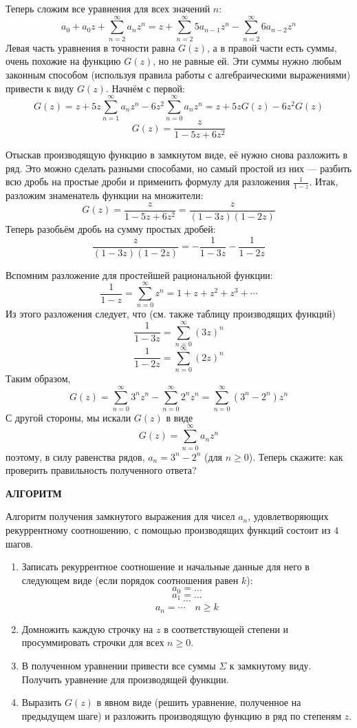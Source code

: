 \documentclass[12pt, letterpaper]{extarticle}
\begin{document}
Теперь сложим все уравнения для всех значений $n$:
\[a_0+a_0z+\sum_{n=2}^{\infty}a_nz^n=z+\sum_{n=2}^{\infty}5a_{n-1}z^n-\sum_{n=2}^{\infty}6a_{n-2}z^{n}\]
Левая часть уравнения в точности равна $G(z)$, а в правой части есть суммы, очень похожие на функцию $G(z)$, но не равные ей. Эти суммы нужно любым законным способом (используя правила работы с алгебраическими выражениями) привести к виду $G(z)$. Начнём с первой:
\[G(z)=z+5z\sum_{n=1}^{\infty}a_nz^n-6z^2\sum_{n=0}^{\infty}a_nz^n=z+5zG(z)-6z^2G(z)\]
\[G(z)=\frac{z}{1-5z+6z^2}\]

Отыскав производящую функцию в замкнутом виде, её нужно снова разложить в ряд. Это можно сделать разными способами, но самый простой из них — разбить всю дробь на простые дроби и применить формулу для разложения $\frac{1}{1-z}$. Итак, разложим знаменатель функции на множители:
\[G(z)=\frac{z}{1-5z+6z^2}=\frac{z}{(1-3z)(1-2z)}\]
Теперь разобьём дробь на сумму простых дробей:
\[\frac{z}{(1-3z)(1-2z)}=-\frac{1}{1-3z}-\frac{1}{1-2z}\]

Вспомним разложение для простейшей рациональной функции:
\[\frac{1}{1-z}=\sum_{n=0}^{\infty}z^n=1+z+z^2+z^3+\cdots\]
Из этого разложения следует, что (см. также таблицу производящих функций)
\[\frac{1}{1-3z}=\sum_{n=0}^{\infty}(3z)^n\]
\[\frac{1}{1-2z}=\sum_{n=0}^{\infty}(2z)^n\]
Таким образом,
\[G(z)=\sum_{n=0}^{\infty}3^nz^n-\sum_{n=0}^{\infty}2^nz^n=\sum_{n=0}^{\infty}(3^n-2^n)z^n\]
С другой стороны, мы искали $G(z)$ в виде
\[G(z)=\sum_{n=0}^{\infty}a_nz^n\]
поэтому, в силу равенства рядов, $a_n=3^n-2^n$ (для $n\geq0$). Теперь скажите: как проверить правильность полученного ответа?
\begin{center}
  \textbf{АЛГОРИТМ}
\end{center}

Алгоритм получения замкнутого выражения для чисел $a_n$, удовлетворяющих рекуррентному соотношению, с помощью производящих функций состоит из $4$ шагов.

\begin{enumerate}
  \item Записать рекуррентное соотношение и начальные данные для него в следующем виде (если порядок соотношения равен $k$):
  \[a_0=\dots\]
  \[a_1=\dots\]
  \[\cdots\]
  \[a_n=\cdots\quad n\geq k\]
  \item Домножить каждую строчку на $z$ в соответствующей степени и просуммировать строчки для всех $n\geq0$.
  \item В полученном уравнении привести все суммы $\Sigma$ к замкнутому виду. Получить уравнение для производящей функции.
  \item Выразить $G(z)$ в явном виде (решить уравнение, полученное на предыдущем шаге) и разложить производящую функцию в ряд по степеням $z$.
\end{enumerate}
\end{document}
